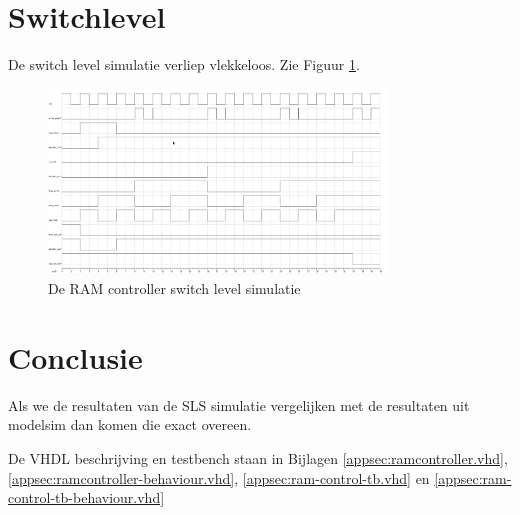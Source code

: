 \documentclass{scrreprt} %
\begin{document}
\section{Switchlevel}
De switch level simulatie verliep vlekkeloos. Zie Figuur \ref{fig:ramcontroller-sl-sim}.
\begin{figure}[H]
\centering
	\includegraphics[width=0.8\textwidth]{resources/wave_sls.png}
	\caption{De RAM controller switch level simulatie}
	\label{fig:ramcontroller-sl-sim}
\end{figure}

\section{Conclusie}
Als we de resultaten van de SLS simulatie vergelijken met de resultaten uit modelsim dan komen die exact overeen.

De VHDL beschrijving en testbench staan in Bijlagen \ref{appsec:ramcontroller.vhd}, \ref{appsec:ramcontroller-behaviour.vhd}, \ref{appsec:ram-control-tb.vhd} en \ref{appsec:ram-control-tb-behaviour.vhd}
\end{document}
